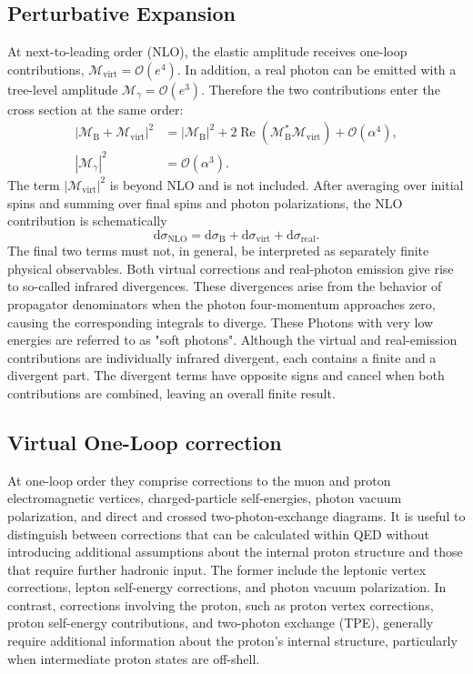 \subsection{Perturbative Expansion}
At next-to-leading order (NLO), the elastic amplitude receives one-loop contributions, $\mathcal{M}_{\mathrm{virt}}=\mathcal{O}(e^4)$. In addition, a real photon can be emitted with a tree-level amplitude $\mathcal{M}_{\gamma}=\mathcal{O}(e^3)$. Therefore the two contributions enter the cross section at the same order:
\begin{align}
    \bigl|\mathcal{M}_{\mathrm B}+\mathcal{M}_{\mathrm{virt}}\bigr|^2
       &=|\mathcal{M}_{\mathrm B}|^2
         +2\operatorname{Re}\!\left(\mathcal{M}_{\mathrm B}^{*}
         \mathcal{M}_{\mathrm{virt}}\right)+\mathcal{O}(\alpha^4),
         \label{eq:nlo_interference}\\
    |\mathcal{M}_{\gamma}|^2&=\mathcal{O}(\alpha^3).
\end{align}
The term $|\mathcal{M}_{\mathrm{virt}}|^2$ is beyond NLO and is not included. After averaging over initial spins and summing over final spins and photon polarizations, the NLO contribution is schematically
\begin{equation}
  \mathrm d\sigma_{\mathrm{NLO}}
     =\mathrm d\sigma_{\mathrm B}
      +\mathrm d\sigma_{\mathrm{virt}}
      +\mathrm d\sigma_{\mathrm{real}}.
  \label{eq:nlo_symbolic}
\end{equation}
The final two terms must not, in general, be interpreted as separately finite physical observables. Both virtual corrections and real-photon emission give rise to so-called infrared divergences. These divergences arise from the behavior of propagator denominators when the photon four-momentum approaches zero, causing the corresponding integrals to diverge. These Photons with very low energies are referred to as "soft photons". Although the virtual and real-emission contributions are individually infrared divergent, each contains a finite and a divergent part. The divergent terms have opposite signs and cancel when both contributions are combined, leaving an overall finite result.

\subsection{Virtual One-Loop correction}
At one-loop order they comprise corrections to the muon and proton electromagnetic vertices, charged-particle self-energies, photon vacuum polarization, and direct and crossed two-photon-exchange diagrams. It is useful to distinguish between corrections that can be calculated within QED without introducing additional assumptions about the internal proton structure and those that require further hadronic input. The former include the leptonic vertex corrections, lepton self-energy corrections, and photon vacuum polarization. In contrast, corrections involving the proton, such as proton vertex corrections, proton self-energy contributions, and two-photon exchange (TPE), generally require additional information about the proton's internal structure, particularly when intermediate proton states are off-shell.

